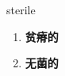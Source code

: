 
\begin{frame}
{\huge sterile}
\begin{center}
\begin{enumerate}\Large
  \item \textbf{贫瘠的}
  \item \textbf{无菌的}
\end{enumerate}
\end{center}
\end{frame}
